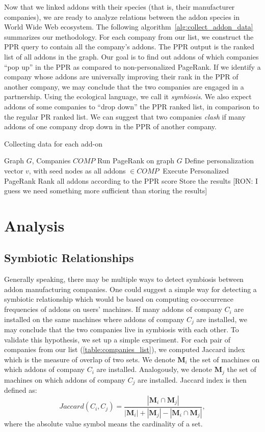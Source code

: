 \documentclass[11pt,oneside]{book}
\let\Oldsection\section
\renewcommand{\section}{\FloatBarrier\Oldsection}
\let\Oldsubsection\subsection
\renewcommand{\subsection}{\FloatBarrier\Oldsubsection}
\begin{document}
Now that we linked addons with their species (that is, their manufacturer companies), we are ready to analyze relations between the addon species in World Wide Web ecosystem. The following algorithm~\autoref{alg:collect_addon_data} summarizes our methodology. 
For each company from our list, we construct the PPR query to contain all the company's addons. The PPR output is the ranked list of all addons in the graph. Our goal is to find out addons of which companies ``pop up'' in the PPR as compared to non-personalized PageRank. If we identify a company whose addons are universally improving their rank in the PPR of another company, we may conclude that the two companies are engaged in a partnership. Using the ecological language, we call it \emph{symbiosis}. We also expect addons of some companies to ``drop down'' the PPR ranked list, in comparison to the regular PR ranked list. We can suggest that two companies \emph{clash} if many addons of one company drop down in the PPR of another company.

\begin{algorithm}[!t]
\caption{Collecting data for each add-on}
\label{alg:collect_addon_data}
\begin{algorithmic}[1] 
\REQUIRE Graph $G$, Companies $COMP$
\STATE Run PageRank on graph $G$
\STATE Define personalization vector $v$, with seed nodes as all addons $\in COMP\ $
\STATE Execute Personalized PageRank
\STATE Rank all addons according to the PPR score
\STATE Store the results [RON: I guess we need something more sufficient than storing the results]
\ENDFOR
\end{algorithmic}
\end{algorithm}

\section{Analysis}
\subsection{Symbiotic Relationships}
\label{sec:symb_relations}

Generally speaking, there may be multiple ways to detect symbiosis between addon manufacturing companies. One could suggest a simple way for detecting a symbiotic relationship which would be based on computing co-occurrence frequencies of addons on users' machines. If many addons of company $C_i$ are installed on the same machines where addons of company $C_j$ are installed, we may conclude that the two companies live in symbiosis with each other. To validate this hypothesis, we set up a simple experiment. For each pair of companies from our list (\autoref{table:companies_list}), we computed Jaccard index~\citep{jaccard1912distribution} which is the measure of overlap of two sets. We denote $\mathbf{M}_i$ the set of machines on which addons of company $C_i$ are installed. Analogously, we denote $\mathbf{M}_j$ the set of machines on which addons of company $C_j$ are installed. Jaccard index is then defined as:
$$
Jaccard(C_i, C_j) = \frac{|\mathbf{M}_i \cap \mathbf{M}_j|}{|\mathbf{M}_i| + |\mathbf{M}_j| - |\mathbf{M}_i \cap \mathbf{M}_j|},
$$
where the absolute value symbol means the cardinality of a set.
\end{document}
